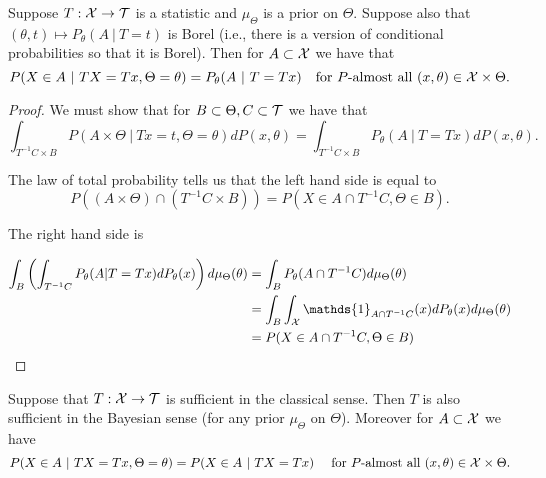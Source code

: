 \documentclass[twoside, a4paper, 10pt]{amsart}
\begin{document}
\begin{lemma} Suppose $T:\mathcal{X} \to \mathcal{T}$ is a statistic and $\mu_{\Theta}$ is a prior on $\Theta$. Suppose also that $(\theta,t) \mapsto P_{\theta}(A~|~T=t)$ is Borel (i.e., there is a version of conditional probabilities so that it is Borel). Then for $A \subset \mathcal{X}$ we have that $$P(X \in A ~|~ TX=Tx, \Theta = \theta) = P_{\theta}(A ~|~ T =Tx) \quad \text{for $P$-almost all $(x,\theta) \in \mathcal{X} \times \Theta$}.$$

\end{lemma}

\begin{proof} We must show that for $B\subset \Theta, C \subset \mathcal{T}$ we have that $$\int_{T^{-1}C \times B} P(A \times \Theta ~|~ Tx = t, \Theta = \theta) dP(x,\theta) = \int_{T^{-1}C \times B} P_{\theta}(A ~|~ T=Tx) dP(x,\theta). $$

The law of total probability tells us that the left hand side is equal to $$P((A \times \Theta) \cap  (T^{-1}C \times B) ) = P(X \in A\cap T^{-1}C, \Theta \in B).$$

The right hand side is

\begin{align*} \int_{B} \left(\int_{T^{-1}C} P_{\theta}(A | T=Tx) dP_{\theta}(x) \right) d\mu_{\Theta}(\theta) &= \int_B P_{\theta}(A \cap T^{-1}C) d\mu_{\Theta}(\theta) \\
&= \int_{B} \int_{\cX} \mathds{1}_{A \cap T^{-1}C}(x) dP_{\theta}(x) d\mu_{\Theta}(\theta) \\
&= P(X \in A\cap T^{-1}C, \Theta \in B)\end{align*} \end{proof}

\begin{thm} Suppose that $T:\mathcal{X} \to \mathcal{T}$ is sufficient in the classical sense. Then $T$ is also sufficient in the Bayesian sense (for any prior $\mu_{\Theta}$ on $\Theta$). Moreover for $A \subset \mathcal{X}$ we have $$P(X \in A~|~ TX=Tx, \Theta = \theta) = P(X \in A~|~ TX=Tx)\quad \text{ for $P$-almost all $(x,\theta) \in \mathcal{X} \times \Theta$}.$$ 

\end{thm}
\end{document}
